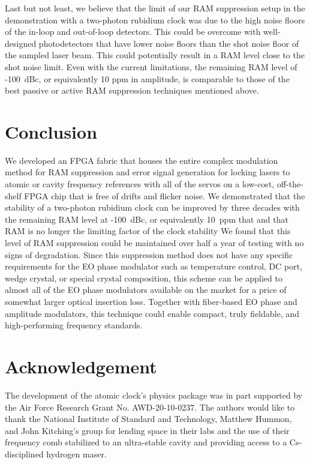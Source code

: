\documentclass[aip,graphicx]{revtex4-2}
\begin{document}
	Last but not least, we believe that the limit of our RAM suppression setup in the demonstration with a two-photon rubidium clock was due to the high noise floors of the in-loop and out-of-loop detectors. This could be overcome with well-designed photodetectors that have lower noise floors than the shot noise floor of the sampled laser beam. This could potentially result in a RAM level close to the shot noise limit. Even with the current limitations, the remaining RAM level of -100~dBc, or equivalently 10 ppm in amplitude, is comparable to those of the best passive or active RAM suppression techniques mentioned above. 
	
	\section{Conclusion}
	We developed an FPGA fabric that houses the entire complex modulation method for RAM suppression and error signal generation for locking lasers to atomic or cavity frequency references with all of the servos on a low-cost, off-the-shelf FPGA chip that is free of drifts and flicker noise. We demonstrated that the stability of a two-photon rubidium clock can be improved by three decades with the remaining RAM level at -100~dBc, or equivalently 10~ppm that and that RAM is no longer the limiting factor of the clock stability We found that this level of RAM suppression could be maintained over half a year of testing with no signs of degradation. Since this suppression method does not have any specific requirements for the EO phase modulator such as temperature control, DC port, wedge crystal, or special crystal composition, this scheme can be applied to almost all of the EO phase modulators available on the market for a price of somewhat larger optical insertion loss. Together with fiber-based EO phase and amplitude modulators, this technique could enable compact, truly fieldable, and high-performing frequency standards.
	
	\section*{Acknowledgement}
	The development of the atomic clock’s physics package was in part supported by the Air Force Research Grant No. AWD-20-10-0237. The authors would like to thank the National Institute of Standard and Technology, Matthew Hummon, and John Kitching’s group for lending space in their labs and the use of their frequency comb stabilized to an ultra-stable cavity and providing access to a Cs-disciplined hydrogen maser.
	
\end{document}
